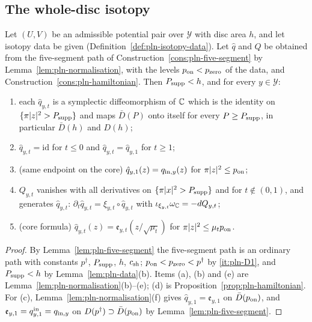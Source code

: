 \subsection{The whole-disc isotopy}\label{sec:pln-isotopy}

\begin{theorem}\label{thm:pln-isotopy}
Let $(U,V)$ be an admissible potential pair over $\mathcal Y$ with disc area $h$, and let isotopy data be given
(Definition~\ref{def:pln-isotopy-data}). Let $\hat q$ and $Q$ be obtained from the five-segment path of
Construction~\ref{cons:pln-five-segment} by Lemma~\ref{lem:pln-normalisation}, with the levels $p_{\rm on}<p_{\rm zero}$ of the data,
and Construction~\ref{cons:pln-hamiltonian}. Then $P_{\rm supp}<h$, and for every $y\in\mathcal Y$:
\begin{enumerate}[label=(\alph*)]
\item each $\hat q_{y,t}$ is a symplectic diffeomorphism of $\mathbb{C}$ which is the identity on $\{\pi|z|^2>P_{\rm supp}\}$ and maps
 $\bar D(P)$ onto itself for every $P\ge P_{\rm supp}$, in particular $\bar D(h)$ and $D(h)$;
\item $\hat q_{y,t}=\mathrm{id}$ for $t\le0$ and $\hat q_{y,t}=\hat q_{y,1}$ for $t\ge1$;
\item (same endpoint on the core) $\hat q_{y,1}(z)=q_{{\rm in},y}(z)$ for $\pi|z|^2\le p_{\rm on}$;
\item $Q_{y,t}$ vanishes with all derivatives on $\{\pi|x|^2>P_{\rm supp}\}$ and for $t\notin(0,1)$, and generates $\hat q_{y,t}$:
 $\partial_t\hat q_{y,t}=\xi_{y,t}\circ\hat q_{y,t}$ with $\iota_{\xi_{y,t}}\omega_{\mathbb{C}}=-dQ_{y,t}$;
\item (core formula) $\hat q_{y,t}(z)=\mathfrak e_{y,t}(z/\sqrt{\mu_t})$ for $\pi|z|^2\le\mu_tp_{\rm on}$.
\end{enumerate}
\end{theorem}

\begin{proof}
By Lemma~\ref{lem:pln-five-segment} the five-segment path is an ordinary path with constants
$p^\dagger$, $P_{\rm supp}$, $h$, $c_{\rm sh}$; $p_{\rm on}<p_{\rm zero}<p^\dagger$ by \ref{it:pln-D1}, and $P_{\rm supp}<h$ by
Lemma~\ref{lem:pln-data}(b). Items (a), (b) and (e) are
Lemma~\ref{lem:pln-normalisation}(b)--(e); (d) is Proposition~\ref{prop:pln-hamiltonian}. For (c),
Lemma~\ref{lem:pln-normalisation}(f) gives $\hat q_{y,1}=\mathfrak e_{y,1}$ on $\bar D(p_{\rm on})$, and
$\mathfrak e_{y,1}=q^{\rm in}_{y,1}=q_{{\rm in},y}$ on $D(p^\dagger)\supset\bar D(p_{\rm on})$ by Lemma~\ref{lem:pln-five-segment}.
\end{proof}

